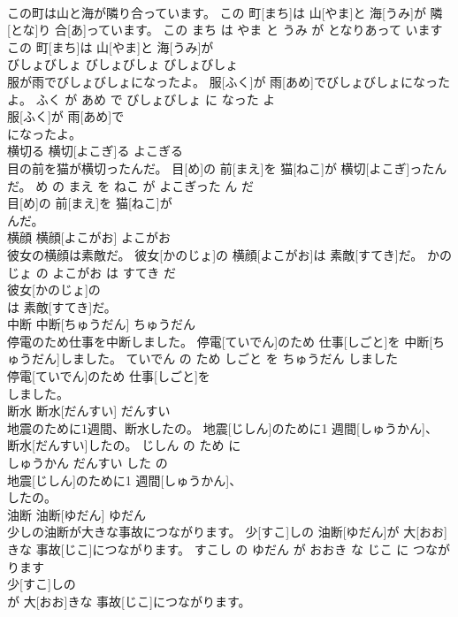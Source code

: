 \documentclass[8pt]{extreport}
\begin{document}
\begin{CJK}{UTF8}{min}
\\	この町は山と海が隣り合っています。	この 町[まち]は 山[やま]と 海[うみ]が 隣[とな]り 合[あ]っています。	この まち は やま と うみ が となりあって います	
\\	この 町[まち]は 山[やま]と 海[うみ]が
\\	びしょびしょ	びしょびしょ	びしょびしょ	
\\	服が雨でびしょびしょになったよ。	服[ふく]が 雨[あめ]でびしょびしょになったよ。	ふく が あめ で びしょびしょ に なった よ	
\\	服[ふく]が 雨[あめ]で
\\	になったよ。			
\\	横切る	横切[よこぎ]る	よこぎる	
\\	目の前を猫が横切ったんだ。	目[め]の 前[まえ]を 猫[ねこ]が 横切[よこぎ]ったんだ。	め の まえ を ねこ が よこぎった ん だ	
\\	目[め]の 前[まえ]を 猫[ねこ]が
\\	んだ。			
\\	横顔	横顔[よこがお]	よこがお	
\\	彼女の横顔は素敵だ。	彼女[かのじょ]の 横顔[よこがお]は 素敵[すてき]だ。	かのじょ の よこがお は すてき だ	
\\	彼女[かのじょ]の
\\	は 素敵[すてき]だ。			
\\	中断	中断[ちゅうだん]	ちゅうだん	
\\	停電のため仕事を中断しました。	停電[ていでん]のため 仕事[しごと]を 中断[ちゅうだん]しました。	ていでん の ため しごと を ちゅうだん しました	
\\	停電[ていでん]のため 仕事[しごと]を
\\	しました。			
\\	断水	断水[だんすい]	だんすい	
\\	地震のために1週間、断水したの。	地震[じしん]のために1 週間[しゅうかん]、 断水[だんすい]したの。	じしん の ため に 
\\	しゅうかん だんすい した の	
\\	地震[じしん]のために1 週間[しゅうかん]、
\\	したの。			
\\	油断	油断[ゆだん]	ゆだん	
\\	少しの油断が大きな事故につながります。	少[すこ]しの 油断[ゆだん]が 大[おお]きな 事故[じこ]につながります。	すこし の ゆだん が おおき な じこ に つながります	
\\	少[すこ]しの
\\	が 大[おお]きな 事故[じこ]につながります。			

\end{CJK}
\end{document}
